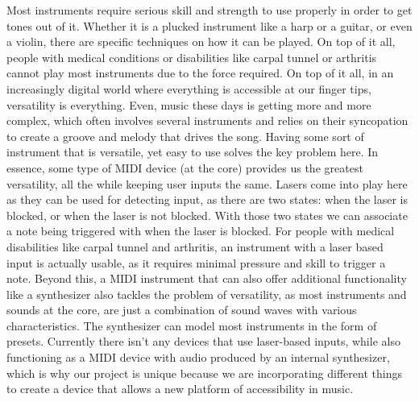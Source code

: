 Most instruments require serious skill and strength to use properly in order to get tones out of it. Whether it is a plucked instrument like a harp or a guitar, or even a violin, there are specific techniques on how it can be played. On top of it all, people with medical conditions or disabilities like carpal tunnel or arthritis cannot play most instruments due to the force required. On top of it all, in an increasingly digital world where everything is accessible at our finger tips, versatility is everything. Even, music these days is getting more and more complex, which often involves several instruments and relies on their syncopation to create a groove and melody that drives the song. Having some sort of instrument that is versatile, yet easy to use solves the key problem here. In essence, some type of MIDI device (at the core) provides us the greatest versatility, all the while keeping user inputs the same. Lasers come into play here as they can be used for detecting input, as there are two states: when the laser is blocked, or when the laser is not blocked. With those two states we can associate a note being triggered with when the laser is blocked. For people with medical disabilities like carpal tunnel and arthritis, an instrument with a laser based input is actually usable, as it requires minimal pressure and skill to trigger a note. Beyond this, a MIDI instrument that can also offer additional functionality like a synthesizer also tackles the problem of versatility, as most instruments and sounds at the core, are just a combination of sound waves with various characteristics. The synthesizer can model most instruments in the form of presets. Currently there isn’t any devices that use laser-based inputs, while also functioning as a MIDI device with audio produced by an internal synthesizer, which is why our project is unique because we are incorporating different things to create a device that allows a new platform of accessibility in music. 
